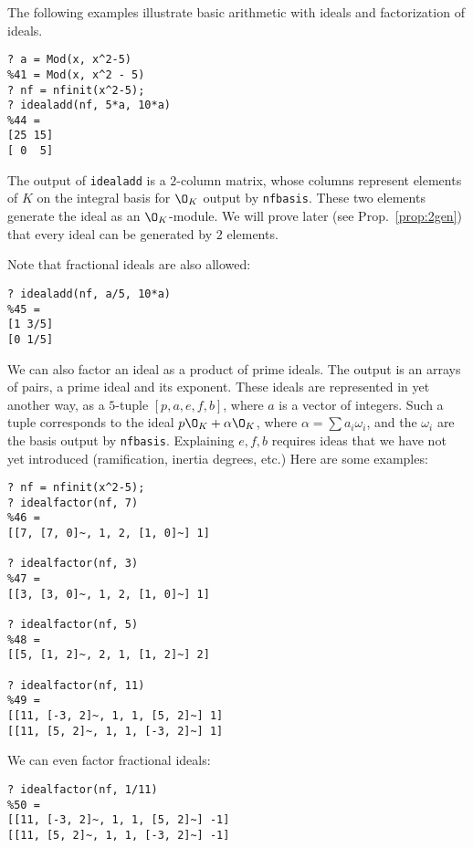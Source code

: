 The following examples illustrate 
basic arithmetic with ideals and factorization of ideals.   
\begin{verbatim}
? a = Mod(x, x^2-5)
%41 = Mod(x, x^2 - 5)
? nf = nfinit(x^2-5);
? idealadd(nf, 5*a, 10*a)
%44 =
[25 15]
[ 0  5]
\end{verbatim}
The output of {\tt idealadd} is a $2$-column matrix, whose columns
represent elements of $K$ on the integral basis for $\O_K$ output by
{\tt nfbasis}.  These two elements generate the ideal as an
$\O_K$-module.  We will prove later (see Prop.~\ref{prop:2gen}) that
every ideal can be generated by $2$ elements.

Note that fractional ideals are also allowed:
\begin{verbatim}? idealadd(nf, a/5, 10*a)
%45 =
[1 3/5]
[0 1/5]
\end{verbatim}

We can also factor an ideal as a product of prime ideals.  The output
is an arrays of pairs, a prime ideal and its exponent.  These ideals
are represented in yet another way, as a $5$-tuple $[p,a,e,f,b]$, where
$a$ is a vector of integers.
Such a tuple corresponds to the ideal $p\O_K + \alpha \O_K$, where 
$\alpha = \sum a_i \omega_i$, and the $\omega_i$ are the basis
output by {\tt nfbasis}.  Explaining $e,f,b$ requires ideas that
we have not yet introduced (ramification, inertia degrees, etc.)
Here are some examples:
\begin{verbatim}
? nf = nfinit(x^2-5);
? idealfactor(nf, 7)
%46 =
[[7, [7, 0]~, 1, 2, [1, 0]~] 1]

? idealfactor(nf, 3)
%47 =
[[3, [3, 0]~, 1, 2, [1, 0]~] 1]

? idealfactor(nf, 5)
%48 =
[[5, [1, 2]~, 2, 1, [1, 2]~] 2]

? idealfactor(nf, 11)
%49 =
[[11, [-3, 2]~, 1, 1, [5, 2]~] 1]
[[11, [5, 2]~, 1, 1, [-3, 2]~] 1]
\end{verbatim}
We can even factor fractional ideals:
\begin{verbatim}
? idealfactor(nf, 1/11)
%50 =
[[11, [-3, 2]~, 1, 1, [5, 2]~] -1]
[[11, [5, 2]~, 1, 1, [-3, 2]~] -1]
\end{verbatim}

